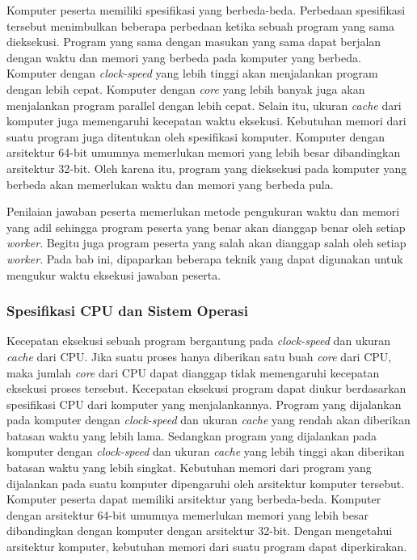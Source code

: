 \par Komputer peserta memiliki spesifikasi yang berbeda-beda. Perbedaan spesifikasi tersebut menimbulkan beberapa perbedaan ketika sebuah program yang sama dieksekusi. Program yang sama dengan masukan yang sama dapat berjalan dengan waktu dan memori yang berbeda pada komputer yang berbeda. Komputer dengan \textit{clock-speed} yang lebih tinggi akan menjalankan program dengan lebih cepat. Komputer dengan \textit{core} yang lebih banyak juga akan menjalankan program parallel dengan lebih cepat. Selain itu, ukuran \textit{cache} dari komputer juga memengaruhi kecepatan waktu eksekusi. Kebutuhan memori dari suatu program juga ditentukan oleh spesifikasi komputer. Komputer dengan arsitektur 64-bit umumnya memerlukan memori yang lebih besar dibandingkan arsitektur 32-bit. Oleh karena itu, program yang dieksekusi pada komputer yang berbeda akan memerlukan waktu dan memori yang berbeda pula.

\par Penilaian jawaban peserta memerlukan metode pengukuran waktu dan memori yang adil sehingga program peserta yang benar akan dianggap benar oleh setiap \textit{worker}. Begitu juga program peserta yang salah akan dianggap salah oleh setiap \textit{worker}. Pada bab ini, dipaparkan beberapa teknik yang dapat digunakan untuk mengukur waktu eksekusi jawaban peserta.

\subsubsection{Spesifikasi CPU dan Sistem Operasi}

\par Kecepatan eksekusi sebuah program bergantung pada \textit{clock-speed} dan ukuran \textit{cache} dari CPU. Jika suatu proses hanya diberikan satu buah \textit{core} dari CPU, maka jumlah \textit{core} dari CPU dapat dianggap tidak memengaruhi kecepatan eksekusi proses tersebut. Kecepatan eksekusi program dapat diukur berdasarkan spesifikasi CPU dari komputer yang menjalankannya. Program yang dijalankan pada komputer dengan \textit{clock-speed} dan ukuran \textit{cache} yang rendah akan diberikan batasan waktu yang lebih lama. Sedangkan program yang dijalankan pada komputer dengan \textit{clock-speed} dan ukuran \textit{cache} yang lebih tinggi akan diberikan batasan waktu yang lebih singkat. Kebutuhan memori dari program yang dijalankan pada suatu komputer dipengaruhi oleh arsitektur komputer tersebut. Komputer peserta dapat memiliki arsitektur yang berbeda-beda. Komputer dengan arsitektur 64-bit umumnya memerlukan memori yang lebih besar dibandingkan dengan komputer dengan arsitektur 32-bit. Dengan mengetahui arsitektur komputer, kebutuhan memori dari suatu program dapat diperkirakan.

